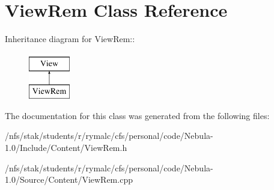 \hypertarget{classViewRem}{
\section{ViewRem Class Reference}
\label{classViewRem}
}
Inheritance diagram for ViewRem::\begin{figure}[H]
\begin{center}
\leavevmode
\includegraphics[height=2cm]{classViewRem}
\end{center}
\end{figure}


The documentation for this class was generated from the following files:\begin{DoxyCompactItemize}
\item 
/nfs/stak/students/r/rymalc/cfs/personal/code/Nebula-\/1.0/Include/Content/ViewRem.h\item 
/nfs/stak/students/r/rymalc/cfs/personal/code/Nebula-\/1.0/Source/Content/ViewRem.cpp\end{DoxyCompactItemize}
